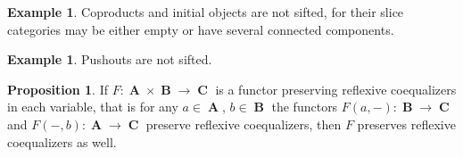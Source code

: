 \documentclass[a4paper,11pt,twoside, openany]{book}
\DeclareMathOperator{\A}{\mathbf{A}}
\DeclareMathOperator{\B}{\mathbf{B}}
\DeclareMathOperator{\C}{\mathbf{C}}
\theoremstyle{definition}
\theoremstyle{definition}
\newtheorem{exmp}[thm]{Example} %
\newtheorem{prop}[thm]{Proposition}
\theoremstyle{remark}
\begin{document}
	\begin{exmp}
		Coproducts and initial objects are not sifted, for their slice categories may be either empty or have several connected components.
	\end{exmp}
	
	\begin{exmp}
		Pushouts are not sifted.
	\end{exmp}
	
	\begin{prop}
		If $F\colon\A\times\B\rightarrow\C$ is a functor preserving reflexive coequalizers in each variable, that is for any $a\in\A$, $b\in\B$ the functors $F(a,-)\colon\B\rightarrow\C$ and $F(-,b)\colon\A\rightarrow\C$ preserve reflexive coequalizers, then $F$ preserves reflexive coequalizers as well.
	\end{prop}
	
\end{document}
